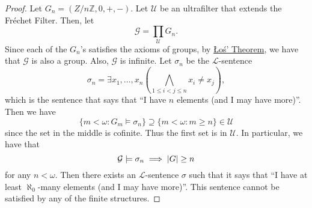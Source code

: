 \documentclass[notoc,notitlepage]{tufte-book}
\begin{document}
\begin{proof}
  Let $G_n = \left( Z / n \mathbb{Z}, 0, + , - \right)$. Let $\mathcal{U}$ be an ultrafilter that extends the Fr\'{e}chet Filter. Then, let
  \begin{equation*}
    \mathcal{G} = \prod_{\mathcal{U}} G_n.
  \end{equation*}
  Since each of the $G_n$'s satisfies the axioms of groups, by \hyperref[thm:los]{{\L}o\'{s}' Theorem}, we have that $\mathcal{G}$ is also a group. Also, $\mathcal{G}$ is infinite. Let $\sigma_n$ be the $\mathcal{L}$-sentence
  \begin{equation*}
    \sigma_n = \exists x_1, \ldots, x_n \left( \bigwedge_{1 \leq i < j \leq n} x_i \neq x_j \right),
  \end{equation*}
  which is the sentence that says that ``I have $n$ elements (and I may have more)''. Then we have
  \begin{equation*}
    \{ m < \omega : G_m \models \sigma_n \} \supseteq \{ m < \omega : m \geq n \} \in \mathcal{U}
  \end{equation*}
  since the set in the middle is cofinite. Thus the first set is in $\mathcal{U}$. In particular, we have that
  \begin{equation*}
    \mathcal{G} \models \sigma_n \implies \left| G \right| \geq n
  \end{equation*}
  for any $n < \omega$. Then there exists an $\mathcal{L}$-sentence $\sigma$ such that it says that ``I have at least $\aleph_0$-many elements (and I may have more)''. This sentence cannot be satisfied by any of the finite structures.
\end{proof}




\appendix

\backmatter\

\pagestyle{plain}



\printindex

\listoftodos
\end{document}
